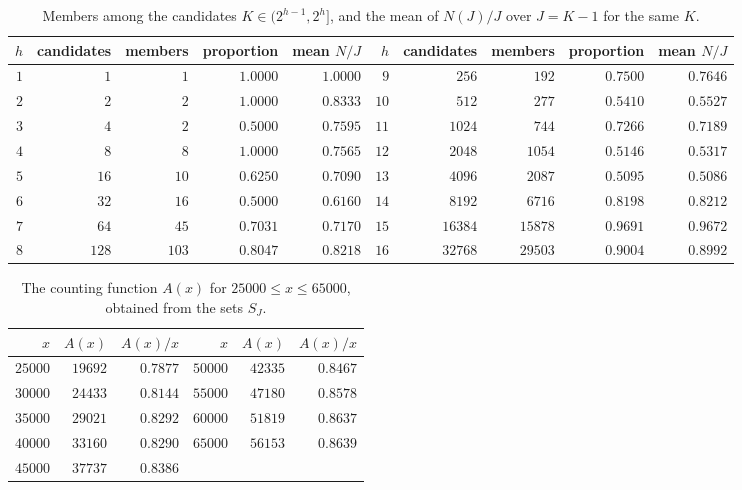 \documentclass[11pt]{amsart}
\theoremstyle{definition}
\begin{document}
\begin{table}[H]
\centering
\caption{Members among the candidates $K\in(2^{h-1},2^h]$, and the mean of $N(J)/J$ over $J=K-1$ for the same $K$.}
\label{tab:blocks16}
\begin{tabular}{rrrrr@{\qquad}rrrrr}
\toprule
$h$ & candidates & members & proportion & mean $N/J$ & $h$ & candidates & members & proportion & mean $N/J$\\
\midrule
$1$ & $1$ & $1$ & $1.0000$ & $1.0000$ & $9$ & $256$ & $192$ & $0.7500$ & $0.7646$\\
$2$ & $2$ & $2$ & $1.0000$ & $0.8333$ & $10$ & $512$ & $277$ & $0.5410$ & $0.5527$\\
$3$ & $4$ & $2$ & $0.5000$ & $0.7595$ & $11$ & $1024$ & $744$ & $0.7266$ & $0.7189$\\
$4$ & $8$ & $8$ & $1.0000$ & $0.7565$ & $12$ & $2048$ & $1054$ & $0.5146$ & $0.5317$\\
$5$ & $16$ & $10$ & $0.6250$ & $0.7090$ & $13$ & $4096$ & $2087$ & $0.5095$ & $0.5086$\\
$6$ & $32$ & $16$ & $0.5000$ & $0.6160$ & $14$ & $8192$ & $6716$ & $0.8198$ & $0.8212$\\
$7$ & $64$ & $45$ & $0.7031$ & $0.7170$ & $15$ & $16384$ & $15878$ & $0.9691$ & $0.9672$\\
$8$ & $128$ & $103$ & $0.8047$ & $0.8218$ & $16$ & $32768$ & $29503$ & $0.9004$ & $0.8992$\\
\bottomrule
\end{tabular}
\end{table}

\begin{table}[H]
\centering
\caption{The counting function $A(x)$ for $25000\le x\le65000$, obtained from the sets $S_J$.}
\label{tab:counting65}
\begin{tabular}{rrr@{\qquad}rrr}
\toprule
$x$ & $A(x)$ & $A(x)/x$ & $x$ & $A(x)$ & $A(x)/x$\\
\midrule
$25000$ & $19692$ & $0.7877$ & $50000$ & $42335$ & $0.8467$\\
$30000$ & $24433$ & $0.8144$ & $55000$ & $47180$ & $0.8578$\\
$35000$ & $29021$ & $0.8292$ & $60000$ & $51819$ & $0.8637$\\
$40000$ & $33160$ & $0.8290$ & $65000$ & $56153$ & $0.8639$\\
$45000$ & $37737$ & $0.8386$ & & &\\
\bottomrule
\end{tabular}
\end{table}
\end{document}
